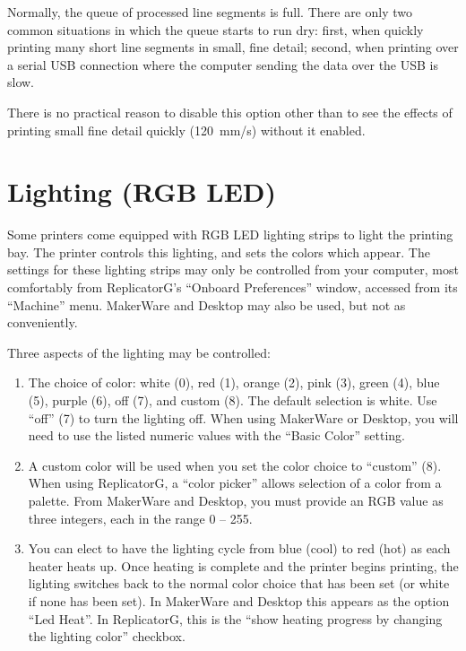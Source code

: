 Normally, the queue of processed line segments is full.  There are only two common situations in which the queue starts to run dry: first, when quickly printing many short line segments in small, fine detail;  second, when printing over a serial USB connection where the computer sending the data over the USB is slow.

There is no practical reason to disable this option other than to see the effects of printing small fine detail quickly (120~mm/s) without it enabled.


\section{Lighting (RGB LED)} \label{sec:rgb-led}

Some printers come equipped with RGB LED lighting strips to light the printing bay.  The printer controls this lighting, and sets the colors which appear.  The settings for these lighting strips may only be controlled from your computer, most comfortably from ReplicatorG's ``Onboard Preferences'' window, accessed from its ``Machine'' menu.  MakerWare and Desktop may also be used, but not as conveniently.

Three aspects of the lighting may be controlled:

\begin{enumerate}
\item The choice of color: white (0), red (1), orange (2), pink (3), green (4), blue (5), purple (6), off (7), and custom (8).  The default selection is white. Use ``off'' (7) to turn the lighting off.  When using MakerWare or Desktop, you will need to use the listed numeric values with the ``Basic Color'' setting.
\item A custom color will be used when you set the color choice to ``custom'' (8).  When using ReplicatorG, a ``color picker'' allows selection of a color from a palette.  From MakerWare and Desktop, you must provide an RGB value as three integers, each in the range 0 -- 255.
\item You can elect to have the lighting cycle from blue (cool) to red (hot) as each heater heats up.  Once heating is complete and the printer begins printing, the lighting switches back to the normal color choice that has been set (or white if none has been set). In MakerWare and Desktop this appears as the option ``Led Heat''.  In ReplicatorG, this is the ``show heating progress by changing the lighting color'' checkbox.
\end{enumerate}
